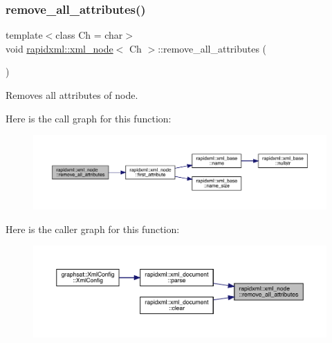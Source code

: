 \subsubsection{\texorpdfstring{remove\_all\_attributes()}{remove\_all\_attributes()}}
{\footnotesize\ttfamily template$<$class Ch = char$>$ \\
void \mbox{\hyperlink{classrapidxml_1_1xml__node}{rapidxml\+::xml\+\_\+node}}$<$ Ch $>$\+::remove\+\_\+all\+\_\+attributes (\begin{DoxyParamCaption}{ }\end{DoxyParamCaption})\hspace{0.3cm}{\ttfamily [inline]}}



Removes all attributes of node. 

Here is the call graph for this function\+:\nopagebreak
\begin{figure}[H]
\begin{center}
\leavevmode
\includegraphics[width=350pt]{classrapidxml_1_1xml__node_aa8d5d9484aa1eb5ff1841a073c84c1aa_cgraph}
\end{center}
\end{figure}
Here is the caller graph for this function\+:\nopagebreak
\begin{figure}[H]
\begin{center}
\leavevmode
\includegraphics[width=350pt]{classrapidxml_1_1xml__node_aa8d5d9484aa1eb5ff1841a073c84c1aa_icgraph}
\end{center}
\end{figure}
\mbox{\label{classrapidxml_1_1xml__node_a95735358b079ae0adcfbbac69aa1fbc3}} 
